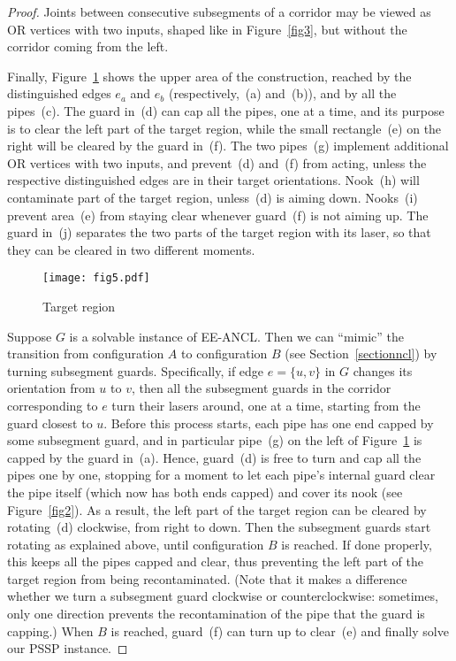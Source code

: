 \documentclass{style}
\newcommand{\computproblem}[1]{\textsc{#1}}
\newcommand{\EEANCL}{\computproblem{EE-ANCL}\xspace}
\newcommand{\PSSP}{\computproblem{PSSP}\xspace}
\begin{document}
\begin{proof}
Joints between consecutive subsegments of a corridor may be viewed as OR vertices with two inputs, shaped like in Figure~\ref{fig3}, but without the corridor coming from the left.

Finally, Figure~\ref{fig5} shows the upper area of the construction, reached by the distinguished edges $e_a$ and $e_b$ (respectively,~(a) and~(b)), and by all the pipes~(c). The guard in~(d) can cap all the pipes, one at a time, and its purpose is to clear the left part of the target region, while the small rectangle~(e) on the right will be cleared by the guard in~(f). The two pipes~(g) implement additional OR vertices with two inputs, and prevent~(d) and~(f) from acting, unless the respective distinguished edges are in their target orientations. Nook~(h) will contaminate part of the target region, unless~(d) is aiming down. Nooks~(i) prevent area~(e) from staying clear whenever guard~(f) is not aiming up. The guard in~(j) separates the two parts of the target region with its laser, so that they can be cleared in two different moments.

\begin{figure}[h]
\centering
\texttt{[image: fig5.pdf]}
\caption{Target region}
\label{fig5}
\end{figure}

Suppose $G$ is a solvable instance of \EEANCL. Then we can ``mimic'' the transition from configuration $A$ to configuration $B$ (see Section~\ref{sectionncl}) by turning subsegment guards. Specifically, if edge $e=\{u,v\}$ in $G$ changes its orientation from $u$ to $v$, then all the subsegment guards in the corridor corresponding to $e$ turn their lasers around, one at a time, starting from the guard closest to $u$. Before this process starts, each pipe has one end capped by some subsegment guard, and in particular pipe~(g) on the left of Figure~\ref{fig5} is capped by the guard in~(a). Hence, guard~(d) is free to turn and cap all the pipes one by one, stopping for a moment to let each pipe's internal guard clear the pipe itself (which now has both ends capped) and cover its nook (see Figure~\ref{fig2}). As a result, the left part of the target region can be cleared by rotating~(d) clockwise, from right to down. Then the subsegment guards start rotating as explained above, until configuration $B$ is reached. If done properly, this keeps all the pipes capped and clear, thus preventing the left part of the target region from being recontaminated. (Note that it makes a difference whether we turn a subsegment guard clockwise or counterclockwise: sometimes, only one direction prevents the recontamination of the pipe that the guard is capping.) When $B$ is reached, guard~(f) can turn up to clear~(e) and finally solve our \PSSP instance.


\end{proof}
\end{document}
